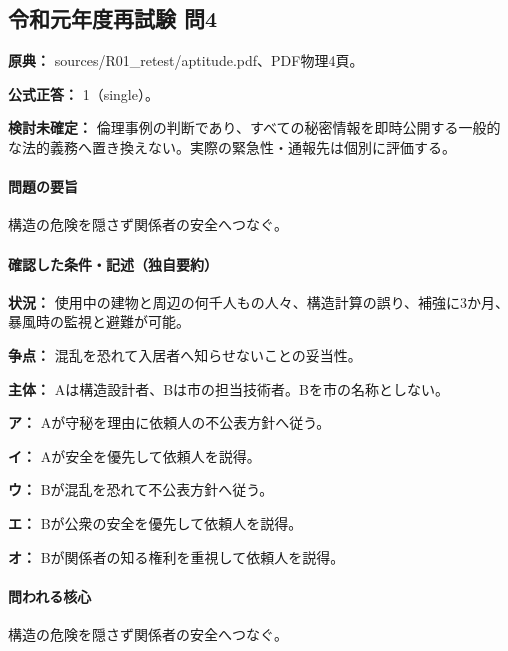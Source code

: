 \subsection{令和元年度再試験 問4}
\label{q:r01-ret-apt-04}

\noindent\textbf{原典：} sources/R01\_retest/aptitude.pdf、PDF物理4頁。

\textbf{公式正答：} 1（single）。

\par\textbf{検討未確定：} 倫理事例の判断であり、すべての秘密情報を即時公開する一般的な法的義務へ置き換えない。実際の緊急性・通報先は個別に評価する。

\paragraph{問題の要旨} 構造の危険を隠さず関係者の安全へつなぐ。

\paragraph{確認した条件・記述（独自要約）}\mbox{}\par

\noindent\textbf{状況：} 使用中の建物と周辺の何千人もの人々、構造計算の誤り、補強に3か月、暴風時の監視と避難が可能。\par

\noindent\textbf{争点：} 混乱を恐れて入居者へ知らせないことの妥当性。\par

\noindent\textbf{主体：} Aは構造設計者、Bは市の担当技術者。Bを市の名称としない。\par

\noindent\textbf{ア：} Aが守秘を理由に依頼人の不公表方針へ従う。\par

\noindent\textbf{イ：} Aが安全を優先して依頼人を説得。\par

\noindent\textbf{ウ：} Bが混乱を恐れて不公表方針へ従う。\par

\noindent\textbf{エ：} Bが公衆の安全を優先して依頼人を説得。\par

\noindent\textbf{オ：} Bが関係者の知る権利を重視して依頼人を説得。\par

\paragraph{問われる核心} 構造の危険を隠さず関係者の安全へつなぐ。

